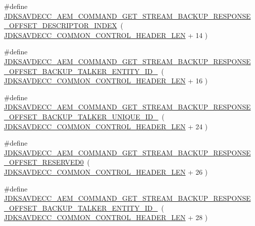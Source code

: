 \begin{DoxyCompactItemize}
\item 
\#define \hyperlink{group__command__get__stream__backup__response_ga63fc6cfda689edbc32a3396e90103db3}{J\+D\+K\+S\+A\+V\+D\+E\+C\+C\+\_\+\+A\+E\+M\+\_\+\+C\+O\+M\+M\+A\+N\+D\+\_\+\+G\+E\+T\+\_\+\+S\+T\+R\+E\+A\+M\+\_\+\+B\+A\+C\+K\+U\+P\+\_\+\+R\+E\+S\+P\+O\+N\+S\+E\+\_\+\+O\+F\+F\+S\+E\+T\+\_\+\+D\+E\+S\+C\+R\+I\+P\+T\+O\+R\+\_\+\+I\+N\+D\+EX}~( \hyperlink{group__jdksavdecc__avtp__common__control__header_gaae84052886fb1bb42f3bc5f85b741dff}{J\+D\+K\+S\+A\+V\+D\+E\+C\+C\+\_\+\+C\+O\+M\+M\+O\+N\+\_\+\+C\+O\+N\+T\+R\+O\+L\+\_\+\+H\+E\+A\+D\+E\+R\+\_\+\+L\+EN} + 14 )
\item 
\#define \hyperlink{group__command__get__stream__backup__response_gae29967ecc4eb2497f58f212e5cd357b8}{J\+D\+K\+S\+A\+V\+D\+E\+C\+C\+\_\+\+A\+E\+M\+\_\+\+C\+O\+M\+M\+A\+N\+D\+\_\+\+G\+E\+T\+\_\+\+S\+T\+R\+E\+A\+M\+\_\+\+B\+A\+C\+K\+U\+P\+\_\+\+R\+E\+S\+P\+O\+N\+S\+E\+\_\+\+O\+F\+F\+S\+E\+T\+\_\+\+B\+A\+C\+K\+U\+P\+\_\+\+T\+A\+L\+K\+E\+R\+\_\+\+E\+N\+T\+I\+T\+Y\+\_\+\+I\+D\+\_}~( \hyperlink{group__jdksavdecc__avtp__common__control__header_gaae84052886fb1bb42f3bc5f85b741dff}{J\+D\+K\+S\+A\+V\+D\+E\+C\+C\+\_\+\+C\+O\+M\+M\+O\+N\+\_\+\+C\+O\+N\+T\+R\+O\+L\+\_\+\+H\+E\+A\+D\+E\+R\+\_\+\+L\+EN} + 16 )
\item 
\#define \hyperlink{group__command__get__stream__backup__response_gab683c57d9ec163d21b222f1edfec2572}{J\+D\+K\+S\+A\+V\+D\+E\+C\+C\+\_\+\+A\+E\+M\+\_\+\+C\+O\+M\+M\+A\+N\+D\+\_\+\+G\+E\+T\+\_\+\+S\+T\+R\+E\+A\+M\+\_\+\+B\+A\+C\+K\+U\+P\+\_\+\+R\+E\+S\+P\+O\+N\+S\+E\+\_\+\+O\+F\+F\+S\+E\+T\+\_\+\+B\+A\+C\+K\+U\+P\+\_\+\+T\+A\+L\+K\+E\+R\+\_\+\+U\+N\+I\+Q\+U\+E\+\_\+\+I\+D\+\_}~( \hyperlink{group__jdksavdecc__avtp__common__control__header_gaae84052886fb1bb42f3bc5f85b741dff}{J\+D\+K\+S\+A\+V\+D\+E\+C\+C\+\_\+\+C\+O\+M\+M\+O\+N\+\_\+\+C\+O\+N\+T\+R\+O\+L\+\_\+\+H\+E\+A\+D\+E\+R\+\_\+\+L\+EN} + 24 )
\item 
\#define \hyperlink{group__command__get__stream__backup__response_gace5c42cf230031afe982c72a3feb89c1}{J\+D\+K\+S\+A\+V\+D\+E\+C\+C\+\_\+\+A\+E\+M\+\_\+\+C\+O\+M\+M\+A\+N\+D\+\_\+\+G\+E\+T\+\_\+\+S\+T\+R\+E\+A\+M\+\_\+\+B\+A\+C\+K\+U\+P\+\_\+\+R\+E\+S\+P\+O\+N\+S\+E\+\_\+\+O\+F\+F\+S\+E\+T\+\_\+\+R\+E\+S\+E\+R\+V\+E\+D0}~( \hyperlink{group__jdksavdecc__avtp__common__control__header_gaae84052886fb1bb42f3bc5f85b741dff}{J\+D\+K\+S\+A\+V\+D\+E\+C\+C\+\_\+\+C\+O\+M\+M\+O\+N\+\_\+\+C\+O\+N\+T\+R\+O\+L\+\_\+\+H\+E\+A\+D\+E\+R\+\_\+\+L\+EN} + 26 )
\item 
\#define \hyperlink{group__command__get__stream__backup__response_gaa94d43331f4ac56a3ec961a23322e1f3}{J\+D\+K\+S\+A\+V\+D\+E\+C\+C\+\_\+\+A\+E\+M\+\_\+\+C\+O\+M\+M\+A\+N\+D\+\_\+\+G\+E\+T\+\_\+\+S\+T\+R\+E\+A\+M\+\_\+\+B\+A\+C\+K\+U\+P\+\_\+\+R\+E\+S\+P\+O\+N\+S\+E\+\_\+\+O\+F\+F\+S\+E\+T\+\_\+\+B\+A\+C\+K\+U\+P\+\_\+\+T\+A\+L\+K\+E\+R\+\_\+\+E\+N\+T\+I\+T\+Y\+\_\+\+I\+D\+\_}~( \hyperlink{group__jdksavdecc__avtp__common__control__header_gaae84052886fb1bb42f3bc5f85b741dff}{J\+D\+K\+S\+A\+V\+D\+E\+C\+C\+\_\+\+C\+O\+M\+M\+O\+N\+\_\+\+C\+O\+N\+T\+R\+O\+L\+\_\+\+H\+E\+A\+D\+E\+R\+\_\+\+L\+EN} + 28 )

\end{DoxyCompactItemize}
